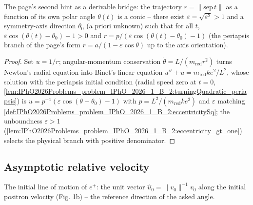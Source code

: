 \begin{theorem}
\label{thm:IPhO2026Problems_problem_IPhO_2026_1_B_2:orbit_eq_conic}
The page's second hint as a derivable bridge: the trajectory
$r = \lVert \mathrm{sep}\,t \rVert$ as a function of its own polar angle
$\theta(t)$ is a conic -- there exist $\varepsilon = \sqrt{\varepsilon^2} > 1$
and a symmetry-axis direction $\theta_0$ (a priori unknown) such that for
all $t$, $\varepsilon\cos(\theta(t) - \theta_0) - 1 > 0$ and
$r = p/(\varepsilon\cos(\theta(t) - \theta_0) - 1)$ (the periapsis branch
of the page's form $r = a/(1 - \varepsilon\cos\theta)$ up to the axis
orientation).
\end{theorem}
\begin{proof}
Set $u = 1/r$; angular-momentum conservation
$\dot\theta = L/(m_{\mathrm{red}} r^2)$
turns Newton's radial equation into Binet's linear equation
$u'' + u = m_{\mathrm{red}} k e^2/L^2$, whose solution with the periapsis
initial condition (radial speed zero at $t = 0$,
\cref{lem:IPhO2026Problems_problem_IPhO_2026_1_B_2:turningQuadratic_periapsis})
is $u = p^{-1}(\varepsilon\cos(\theta - \theta_0) - 1)$ with
$p = L^2/(m_{\mathrm{red}} k e^2)$ and $\varepsilon$ matching
\cref{def:IPhO2026Problems_problem_IPhO_2026_1_B_2:eccentricitySq};
the unboundness $\varepsilon > 1$
(\cref{lem:IPhO2026Problems_problem_IPhO_2026_1_B_2:eccentricity_gt_one})
selects the physical branch with positive denominator.
\end{proof}

\subsection*{Asymptotic relative velocity}

\begin{definition}
\label{def:IPhO2026Problems_problem_IPhO_2026_1_B_2:initialDirection}
The initial line of motion of $e^+$: the unit vector
$\hat u_0 = \lVert v_0 \rVert^{-1} v_0$ along the initial positron velocity
(Fig. 1b) -- the reference direction of the asked angle.
\end{definition}

